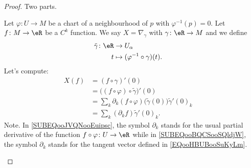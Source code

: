 \begin{proof}
	Two parts.
	\begin{subproof}
		\spitem[Existence]

		Let \(\varphi \colon U\to M \) be a chart of a neighbourhood of \( p\) with \( \varphi^{-1}(p)=0\). Let \(f \colon M\to \eR  \) be a \( C^k\) function. We say \( X=\nabla_{\gamma}\) with \(\gamma \colon \eR\to M  \) and we define
		\begin{equation}
			\begin{aligned}
				\tilde \gamma\colon \eR & \to U_{\alpha}                         \\
				t                       & \mapsto (\varphi^{-1}\circ \gamma)(t).
			\end{aligned}
		\end{equation}
		Let's compute:
		\begin{subequations}
			\begin{align}
				X(f) & =(f\circ\gamma)'(0)                                                                                         \\
				     & =\big((f\circ\varphi)\circ\tilde \gamma\big)'(0)                                                            \\
				     & = \sum_k\partial_k(f\circ\varphi)\big( \tilde \gamma(0) \big)\tilde \gamma'(0)_k		\label{SUBEQooJVQNooEuipsc} \\
				     & =\sum_k(\partial_kf)\tilde \gamma'(0)_k.		\label{SUBEQooBQCSooSQldjW}
			\end{align}
		\end{subequations}
		Note. In \eqref{SUBEQooJVQNooEuipsc}, the symbol \( \partial_k\) stands for the usual partial derivative of the function \(f\circ\varphi \colon U\to \eR  \) while in \eqref{SUBEQooBQCSooSQldjW}, the symbol \( \partial_k\) stands for the tangent vector defined in \eqref{EQooHBUBooSuKyLm}.


\end{subproof}
\end{proof}
